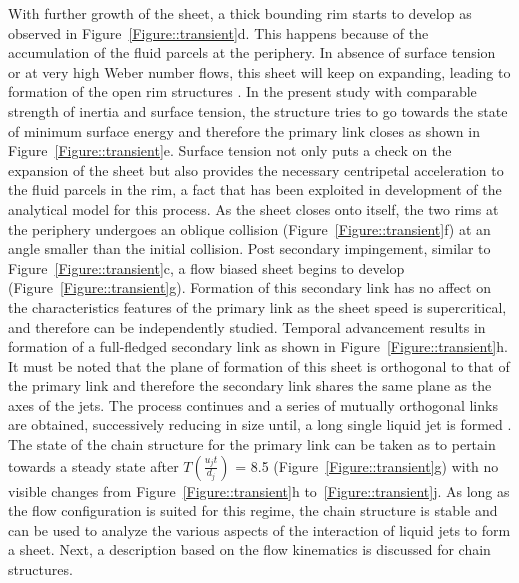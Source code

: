 \documentclass[%
aip,
sd,%
amsmath,amssymb,
preprint,%
author-year,%
]{revtex4-1}
\begin{document}
With further growth of the sheet, a thick bounding rim starts to develop as observed in Figure~\ref{Figure::transient}d. This happens because of the accumulation of the fluid parcels at the periphery. In absence of surface tension or at very high Weber number flows, this sheet will keep on expanding, leading to formation of the open rim structures \cite{taylor1960formation,chen2013high}. In the present study with comparable strength of inertia and surface tension, the structure tries to go towards the state of minimum surface energy and therefore the primary link closes as shown in Figure~\ref{Figure::transient}e. Surface tension not only puts a check on the expansion of the sheet but also provides the necessary centripetal acceleration to the fluid parcels in the rim, a fact that has been exploited in development of the analytical model for this process. As the sheet closes onto itself, the two rims at the periphery undergoes an oblique collision (Figure~\ref{Figure::transient}f) at an angle smaller than the initial collision. Post secondary impingement, similar to Figure~\ref{Figure::transient}c, a flow biased sheet begins to develop (Figure~\ref{Figure::transient}g). Formation of this secondary link has no affect on the characteristics features of the primary link as the sheet speed is supercritical, and therefore can be independently studied. Temporal advancement results in formation of a full-fledged secondary link as shown in Figure~\ref{Figure::transient}h. It must be noted that the plane of formation of this sheet is orthogonal to that of the primary link and therefore the secondary link shares the same plane as the axes of the jets. The process continues and a series of mutually orthogonal links are obtained, successively reducing in size until, a long single liquid jet is formed \citep{bush2004collision}. The state of the chain structure for the primary link can be taken as to pertain towards a steady state after $T (\frac{u_jt}{d_j}) $ = 8.5 (Figure~\ref{Figure::transient}g) with no visible changes from Figure~\ref{Figure::transient}h to~\ref{Figure::transient}j. As long as the flow configuration is suited for this regime, the chain structure is stable and can be used to analyze the various aspects of the interaction of liquid jets to form a sheet. Next, a description based on the flow kinematics is discussed for chain structures.
\end{document}
